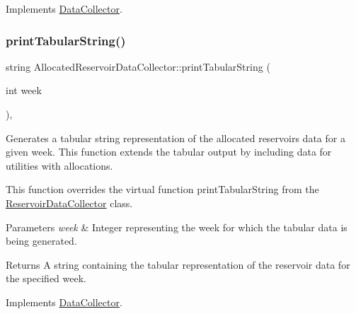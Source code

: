 Implements \mbox{\hyperlink{classDataCollector_a98dcb4ec871d9c7fbf7545c64e5ccc67}{Data\+Collector}}.

\mbox{\label{classAllocatedReservoirDataCollector_ae5a9aa9b2a3cffd8f5ffe983c8fcf6c8}} 
\subsubsection{\texorpdfstring{print\+Tabular\+String()}{printTabularString()}}
{\footnotesize\ttfamily string Allocated\+Reservoir\+Data\+Collector\+::print\+Tabular\+String (\begin{DoxyParamCaption}\item[{int}]{week }\end{DoxyParamCaption})\hspace{0.3cm}{\ttfamily [override]}, {\ttfamily [virtual]}}



Generates a tabular string representation of the allocated reservoir\textquotesingle{}s data for a given week. This function extends the tabular output by including data for utilities with allocations. 

This function overrides the virtual function {\ttfamily print\+Tabular\+String} from the {\ttfamily \mbox{\hyperlink{classReservoirDataCollector}{Reservoir\+Data\+Collector}}} class.


\begin{DoxyParams}{Parameters}
{\em week} & Integer representing the week for which the tabular data is being generated.\\
\hline
\end{DoxyParams}
\begin{DoxyReturn}{Returns}
A string containing the tabular representation of the reservoir data for the specified week. 
\end{DoxyReturn}


Implements \mbox{\hyperlink{classDataCollector_a397fccabe0223267eea8fc7cac0e59da}{Data\+Collector}}.

\mbox{\label{classAllocatedReservoirDataCollector_ae82c7a68af1dce9003cccc6da1800e28}} 
